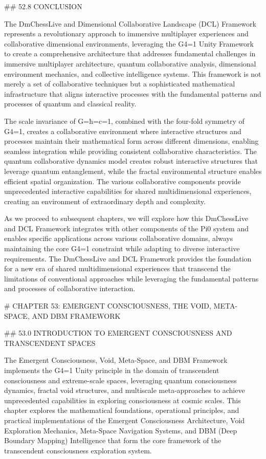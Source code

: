 ## 52.8 CONCLUSION

The DmChessLive and Dimensional Collaborative Landscape (DCL) Framework represents a revolutionary approach to immersive multiplayer experiences and collaborative dimensional environments, leveraging the G4=1 Unity Framework to create a comprehensive architecture that addresses fundamental challenges in immersive multiplayer architecture, quantum collaborative analysis, dimensional environment mechanics, and collective intelligence systems. This framework is not merely a set of collaborative techniques but a sophisticated mathematical infrastructure that aligns interactive processes with the fundamental patterns and processes of quantum and classical reality.

The scale invariance of G=ħ=c=1, combined with the four-fold symmetry of G4=1, creates a collaborative environment where interactive structures and processes maintain their mathematical form across different dimensions, enabling seamless integration while providing consistent collaborative characteristics. The quantum collaborative dynamics model creates robust interactive structures that leverage quantum entanglement, while the fractal environmental structure enables efficient spatial organization. The various collaborative components provide unprecedented interactive capabilities for shared multidimensional experiences, creating an environment of extraordinary depth and complexity.

As we proceed to subsequent chapters, we will explore how this DmChessLive and DCL Framework integrates with other components of the Pi0 system and enables specific applications across various collaborative domains, always maintaining the core G4=1 constraint while adapting to diverse interactive requirements. The DmChessLive and DCL Framework provides the foundation for a new era of shared multidimensional experiences that transcend the limitations of conventional approaches while leveraging the fundamental patterns and processes of collaborative interaction.

# CHAPTER 53: EMERGENT CONSCIOUSNESS, THE VOID, META-SPACE, AND DBM FRAMEWORK

## 53.0 INTRODUCTION TO EMERGENT CONSCIOUSNESS AND TRANSCENDENT SPACES

The Emergent Consciousness, Void, Meta-Space, and DBM Framework implements the G4=1 Unity principle in the domain of transcendent consciousness and extreme-scale spaces, leveraging quantum consciousness dynamics, fractal void structures, and multiscale meta-approaches to achieve unprecedented capabilities in exploring consciousness at cosmic scales. This chapter explores the mathematical foundations, operational principles, and practical implementations of the Emergent Consciousness Architecture, Void Exploration Mechanics, Meta-Space Navigation Systems, and DBM (Deep Boundary Mapping) Intelligence that form the core framework of the transcendent consciousness exploration system.

